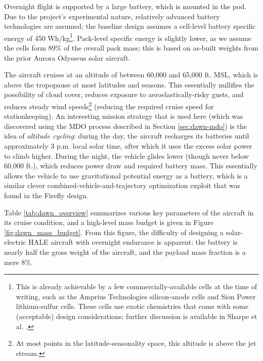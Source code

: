 Overnight flight is supported by a large battery, which is mounted in the pod. Due to the project's experimental nature, relatively advanced battery technologies are assumed; the baseline design assumes a cell-level battery specific energy of 450 Wh/kg\footnote{This is already achievable by a few commercially-available cells at the time of writing, such as the Amprius Technologies silicon-anode cells and Sion Power lithium-sulfur cells. These cells use exotic chemistries that come with some (acceptable) design considerations; further discussion is available in Sharpe et al. \cite{sharpe_optimization_2021}.}. Pack-level specific energy is slightly lower, as we assume the cells form 89\% of the overall pack mass; this is based on as-built weights from the prior Aurora Odysseus solar aircraft.

The aircraft cruises at an altitude of between 60,000 and 65,000 ft. MSL, which is above the tropopause at most latitudes and seasons. This essentially nullifies the possibility of cloud cover, reduces exposure to aeroelastically-risky gusts, and reduces steady wind speeds\footnote{At most points in the latitude-seasonality space, this altitude is above the jet stream.} (reducing the required cruise speed for stationkeeping). An interesting mission strategy that is used here (which was discovered using the MDO process described in Section \ref{sec:dawn-mdo}) is the idea of \emph{altitude cycling}: during the day, the aircraft recharges its batteries until approximately 3 p.m. local solar time, after which it uses the excess solar power to climb higher. During the night, the vehicle glides lower (though never below 60,000 ft.), which reduces power draw and required battery mass. This essentially allows the vehicle to use gravitational potential energy as a battery, which is a similar clever combined-vehicle-and-trajectory optimization exploit that was found in the Firefly design.

Table \ref{tab:dawn_overview} summarizes various key parameters of the aircraft in its cruise condition, and a high-level mass budget is given in Figure \ref{fig:dawn_mass_budget}. From this figure, the difficulty of designing a solar-electric HALE aircraft with overnight endurance is apparent: the battery is nearly half the gross weight of the aircraft, and the payload mass fraction is a mere 8\%.

